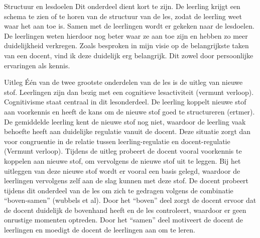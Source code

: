 \documentclass{article}
\begin{document}
{                Structuur en lesdoelen
                Dit onderdeel dient kort te zijn. De leerling krijgt een schema te zien of te horen van de structuur van de les, zodat de leerling weet waar het aan toe is. Samen met de leerlingen wordt er gekeken naar de lesdoelen. De leerlingen weten hierdoor nog beter waar ze aan toe zijn en hebben zo meer duidelijkheid verkregen. Zoals besproken in mijn visie op de belangrijkste taken van een docent, vind ik deze duidelijk erg belangrijk. Dit zowel door persoonlijke ervaringen als kennis.
                
                Uitleg
                Één van de twee grootste onderdelen van de les is de uitleg van nieuwe stof. Leerlingen zijn dan bezig met een cognitieve lesactiviteit (vermunt verloop). 
                Cognitivisme staat centraal in dit lesonderdeel. De leerling koppelt nieuwe stof aan voorkennis en heeft de kans om de nieuwe stof goed te structureren (ertmer). De gemiddelde leerling kent de nieuwe stof nog niet, waardoor de leerling vaak behoefte heeft aan duidelijke regulatie vanuit de docent. Deze situatie zorgt dan voor congruentie in de relatie tussen leerling-regulatie en docent-regulatie (Vermunt verloop).  
                Tijdens de uitleg probeert de docent vooral voorkennis te koppelen aan nieuwe stof, om vervolgens de nieuwe stof uit te leggen. Bij het uitleggen van deze nieuwe stof wordt er vooral een basis gelegd, waardoor de leerlingen vervolgens zelf aan de slag kunnen met deze stof. 
                De docent probeert tijdens dit onderdeel van de les om zich te gedragen volgens de combinatie “boven-samen” (wubbels et al). Door het “boven” deel zorgt de docent ervoor dat de docent duidelijk de bovenhand heeft en de les controleert, waardoor er geen onrustige momenten optreden. Door het “samen” deel motiveert de docent de leerlingen en moedigt de docent de leerlingen aan om te leren.
                
}
\end{document}
